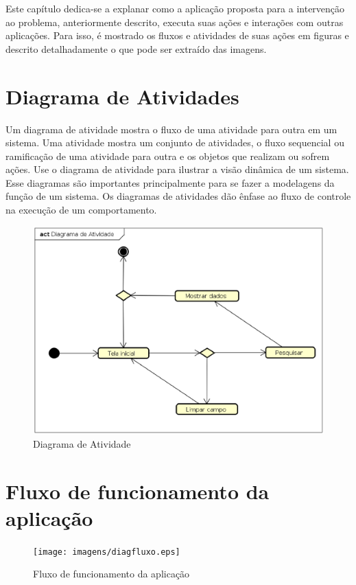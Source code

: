 Este capítulo dedica-se a explanar como a aplicação proposta para a intervenção ao problema, anteriormente descrito, executa suas ações e interações com outras aplicações. Para isso, é mostrado os fluxos e atividades de suas ações em figuras e descrito detalhadamente o que pode ser extraído das imagens.

\section{Diagrama de Atividades}
Um diagrama de atividade mostra o fluxo de uma atividade para outra em um sistema. Uma atividade mostra um conjunto de atividades, o fluxo sequencial ou ramificação de uma atividade para outra e os objetos que realizam ou sofrem ações. Use o diagrama de atividade para ilustrar a visão dinâmica de um sistema. Esse diagramas são importantes principalmente para se fazer a modelagens da função de um sistema. Os diagramas de atividades dão ênfase ao fluxo de controle na execução de um comportamento.

\begin{figure}[!htb]
        \caption{\label{diagrama1}Diagrama de Atividade}
        \begin{center}
                \includegraphics[width=\textwidth]{imagens/diagact.eps}
        \end{center}
\end{figure}

\section{Fluxo de funcionamento da aplicação}

\begin{figure}[!htb]
        \caption{\label{diagrama1}Fluxo de funcionamento da aplicação}
        \begin{center}
                \texttt{[image: imagens/diagfluxo.eps]}
        \end{center}
\end{figure}
